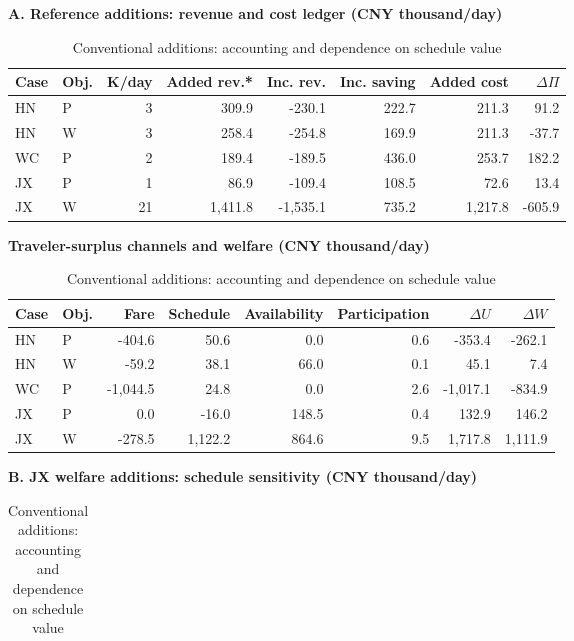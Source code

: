 \begin{table}[htbp]\centering
\caption{Conventional additions: accounting and dependence on schedule value}\label{tab:k_reopening_events}
\begin{minipage}{.95\textwidth}\fontsize{8}{10}\selectfont{}\setlength{\tabcolsep}{2pt}\renewcommand{\arraystretch}{1.08}
\par\noindent\textbf{A. Reference additions: revenue and cost ledger (CNY thousand/day)}\par\smallskip
\begin{tabular*}{\linewidth}{@{\extracolsep{\fill}}llrrrrrr@{}}\toprule
Case & Obj. & K/day & Added rev.* & Inc. rev. & Inc. saving & Added cost & $\Delta\Pi$ \\
\midrule
HN & P & 3 & 309.9 & -230.1 & 222.7 & 211.3 & 91.2 \\
HN & W & 3 & 258.4 & -254.8 & 169.9 & 211.3 & -37.7 \\
WC & P & 2 & 189.4 & -189.5 & 436.0 & 253.7 & 182.2 \\
JX & P & 1 & 86.9 & -109.4 & 108.5 & 72.6 & 13.4 \\
JX & W & 21 & 1,411.8 & -1,535.1 & 735.2 & 1,217.8 & -605.9 \\
\bottomrule\end{tabular*}\par\medskip
\par\noindent\textbf{Traveler-surplus channels and welfare (CNY thousand/day)}\par\smallskip
\begin{tabular*}{\linewidth}{@{\extracolsep{\fill}}llrrrrrr@{}}\toprule
Case & Obj. & Fare & Schedule & Availability & Participation & $\Delta U$ & $\Delta W$ \\
\midrule
HN & P & -404.6 & 50.6 & 0.0 & 0.6 & -353.4 & -262.1 \\
HN & W & -59.2 & 38.1 & 66.0 & 0.1 & 45.1 & 7.4 \\
WC & P & -1,044.5 & 24.8 & 0.0 & 2.6 & -1,017.1 & -834.9 \\
JX & P & 0.0 & -16.0 & 148.5 & 0.4 & 132.9 & 146.2 \\
JX & W & -278.5 & 1,122.2 & 864.6 & 9.5 & 1,717.8 & 1,111.9 \\
\bottomrule\end{tabular*}\par\medskip
\par\noindent\textbf{B. JX welfare additions: schedule sensitivity (CNY thousand/day)}\par\smallskip
\begin{tabular*}{\linewidth}{@{\extracolsep{\fill}}>{\raggedright\arraybackslash}p{.32\linewidth}lrrrr@{}}\toprule

\end{tabular*}
\end{minipage}
\end{table}
